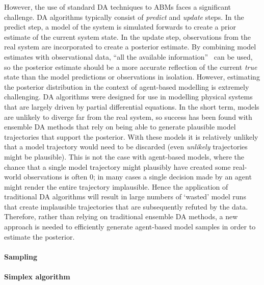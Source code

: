 However, the use of standard DA techniques to ABMs faces a significant challenge. DA algorithms typically consist of \textit{predict} and \textit{update} steps. In the predict step, a model of the system is simulated forwards to create a prior estimate of the current system state. In the update step, observations from the real system are incorporated to create a posterior estimate. By combining model estimates with observational data, ``all the available information''~\cite{talagrand_use_1991} can be used, so the posterior estimate should be a more accurate reflection of the current \textit{true} state than the model predictions or observations in isolation. However, estimating the posterior distribution in the context of agent-based modelling is extremely challenging. 
DA algorithms were designed for use in modelling physical systems~\cite{lewis_dynamic_2006} that are largely driven by partial differential equations. In the short term, models are unlikely to diverge far from the real system, so success has been found with ensemble DA methods that rely on being able to generate plausible model trajectories that support the posterior. With these models it is relatively unlikely that a model trajectory would need to be discarded (even \textit{unlikely} trajectories might be plausible).
This is not the case with agent-based models, where the chance that a single model trajectory might plausibly have created some real-world observations is often 0; in many cases a single decision made by an agent might render the entire trajectory implausible. Hence the application of traditional DA algorithms will result in large numbers of `wasted' model runs that create implausible trajectories that are subsequently refuted by the data. Therefore, rather than relying on traditional ensemble DA methods, a new approach is needed to efficiently generate agent-based model samples in order to estimate the posterior. 


\paragraph{Sampling}



\paragraph{Simplex algorithm}


